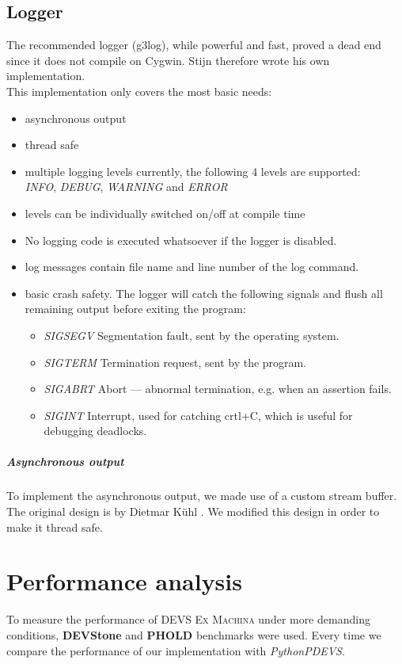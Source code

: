 \documentclass[8pt,a4paper]{report}
\begin{document}
\section{Logger}
The recommended logger (g3log), while powerful and fast, proved a dead end since it does not compile on Cygwin. 
Stijn therefore wrote his own implementation.\\
This implementation only covers the most basic needs:
\begin{itemize}
	\item asynchronous output
	\item thread safe
	\item multiple logging levels currently, the following 4 levels are supported:\\
		\emph{INFO}, \emph{DEBUG}, \emph{WARNING} and \emph{ERROR}
	\item levels can be individually switched on/off at compile time
	\item No logging code is executed whatsoever if the logger is disabled.
	\item log messages contain file name and line number of the log command.
	\item basic crash safety. The logger will catch the following signals and flush all remaining output before exiting the program:
		\begin{itemize}
			\item \emph{SIGSEGV} Segmentation fault, sent by the operating system.
			\item \emph{SIGTERM} Termination request, sent by the program.
			\item \emph{SIGABRT} Abort --- abnormal termination, e.g. when an assertion fails.
			\item \emph{SIGINT} Interrupt, used for catching crtl+C, which is useful for debugging deadlocks.
		\end{itemize}
\end{itemize}

\paragraph{Asynchronous output}
To implement the asynchronous output, we made use of a custom stream buffer. The original design is by Dietmar K{\"u}hl \cite{asynchwrite}. We modified this design in order to make it thread safe.

\chapter{Performance analysis}
To measure the performance of \textsc{DEVS Ex Machina} under more demanding conditions, \textbf{DEVStone} and \textbf{PHOLD} benchmarks were used. Every time we compare the performance of our implementation with \textit{PythonPDEVS}.\\
\end{document}
